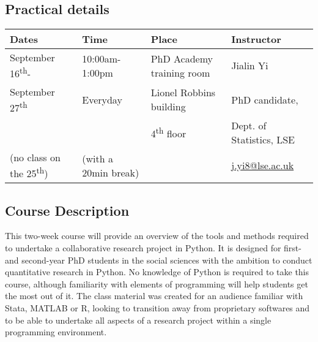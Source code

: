 \documentclass{amsart}
\theoremstyle{definition}
\theoremstyle{remark}
\numberwithin{equation}{section}
\begin{document}

\subsection*{Practical details}


\begin{center}
\begin{tabular}{| p{3.25cm} p{3.5cm} p{4.5cm} p{3.75cm} |} 
\hline
 \textbf{Dates} & \textbf{Time} & \textbf{Place} & \textbf{Instructor} \\
\hline
 September 16\textsuperscript{th}- & 10:00am-1:00pm & PhD Academy training room & Jialin Yi \\
 September 27\textsuperscript{th} & Everyday & Lionel Robbins building & PhD candidate,  \\
     &   & 4\textsuperscript{th} floor &  Dept. of Statistics, LSE \\
    (no class on the 25\textsuperscript{th}) & (with a 20min break)  &  &  \href{
mailto:j.yi8@lse.ac.uk}{j.yi8@lse.ac.uk} \\
\hline
\end{tabular}
\end{center}

\subsection*{Course Description}

This two-week course will provide an overview of the tools and methods required to undertake a collaborative research project in Python. It is designed for first- and second-year PhD students in the social sciences with the ambition to conduct quantitative research in Python. No knowledge of Python is required to take this course, although familiarity with elements of programming will help students get the most out of it. The class material was created for an audience familiar with Stata, MATLAB or R, looking to transition away from proprietary softwares and to be able to undertake all aspects of a research project within a single programming environment. \\
\end{document}
